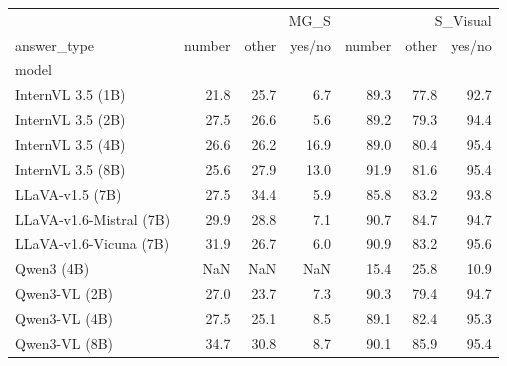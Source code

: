 \begin{tabular}{lrrrrrr}
\toprule
 & \multicolumn{3}{r}{MG_S} & \multicolumn{3}{r}{S_Visual} \\
answer_type & number & other & yes/no & number & other & yes/no \\
model &  &  &  &  &  &  \\
\midrule
InternVL 3.5 (1B) & 21.8 & 25.7 & 6.7 & 89.3 & 77.8 & 92.7 \\
InternVL 3.5 (2B) & 27.5 & 26.6 & 5.6 & 89.2 & 79.3 & 94.4 \\
InternVL 3.5 (4B) & 26.6 & 26.2 & 16.9 & 89.0 & 80.4 & 95.4 \\
InternVL 3.5 (8B) & 25.6 & 27.9 & 13.0 & 91.9 & 81.6 & 95.4 \\
LLaVA-v1.5 (7B) & 27.5 & 34.4 & 5.9 & 85.8 & 83.2 & 93.8 \\
LLaVA-v1.6-Mistral (7B) & 29.9 & 28.8 & 7.1 & 90.7 & 84.7 & 94.7 \\
LLaVA-v1.6-Vicuna (7B) & 31.9 & 26.7 & 6.0 & 90.9 & 83.2 & 95.6 \\
Qwen3 (4B) & NaN & NaN & NaN & 15.4 & 25.8 & 10.9 \\
Qwen3-VL (2B) & 27.0 & 23.7 & 7.3 & 90.3 & 79.4 & 94.7 \\
Qwen3-VL (4B) & 27.5 & 25.1 & 8.5 & 89.1 & 82.4 & 95.3 \\
Qwen3-VL (8B) & 34.7 & 30.8 & 8.7 & 90.1 & 85.9 & 95.4 \\
\bottomrule
\end{tabular}
